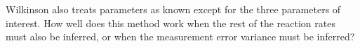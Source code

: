 \documentclass{article}
\newcommand\EMK[1]{\textcolor{purple}{EMK: #1}}
\begin{document}
Wilkinson also treats parameters as known except for the three parameters of interest. How well does this method work when the rest of the reaction rates must also be inferred, or when the measurement error variance must be inferred?




\begin{align*}
\end{align*}
\begin{align*}
\end{align*}
\begin{align*}
\end{align*}
\begin{align*}
\end{align*}
\end{document}
